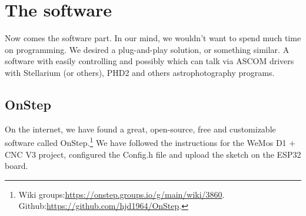 \section{The software}
\label{sec:software}
Now comes the software part.
In our mind, we wouldn't want to spend much time on programming.
We desired a plug-and-play solution, or something similar.
A software with easily controlling and possibly which can talk via ASCOM drivers with Stellarium (or others), PHD2 and others astrophotography programs.

\subsection{OnStep}
On the internet, we have found a great, open-source, free and customizable software called OnStep.\footnote{Wiki groups:\url{https://onstep.groups.io/g/main/wiki/3860}.\\Github:\url{https://github.com/hjd1964/OnStep}.}
We have followed the instructions for the WeMos D1 \(+\) CNC V3 project, configured the Config.h file and upload the sketch on the ESP32 board.
